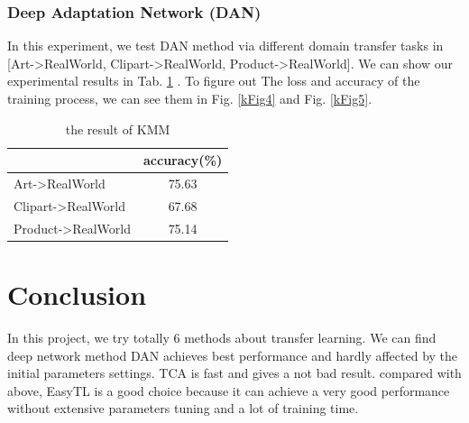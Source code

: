 \documentclass[conference]{IEEEtran}
\begin{document}
\subsubsection{Deep Adaptation Network (DAN)}

In this experiment, we test DAN method via different domain transfer tasks in [Art->RealWorld, Clipart->RealWorld, Product->RealWorld]. We can show our experimental results in Tab. \ref{tab9} . To figure out The loss and accuracy of the training process, we can see them in Fig. \ref{kFig4} and Fig. \ref{kFig5}.

\begin{table}[H]
	\centering
	\caption{the result of KMM}
	\begin{tabular}{|l|c|}
		\hline
		\diagbox{dataset}{result} & accuracy(\%) \\
		\hline
		Art->RealWorld & 75.63\\
		\hline
		Clipart->RealWorld & 67.68 \\
		\hline
		Product->RealWorld & 75.14 \\
		\hline
	\end{tabular}\label{tab9}
\end{table}


\section{Conclusion}
In this project, we try totally 6 methods about transfer learning. We can find deep network method DAN achieves best performance and hardly affected by the initial parameters settings. TCA is fast and gives a not bad result. compared with above, EasyTL is a good choice because it can achieve a very good performance without extensive parameters tuning and a lot of training time.


\end{document}
